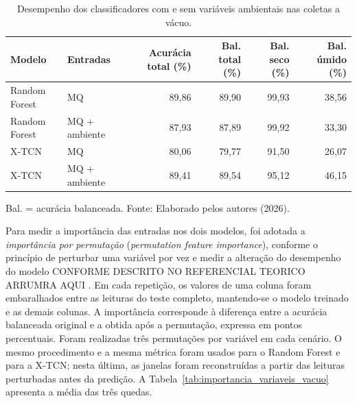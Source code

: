 \begin{table}[htbp]
    \centering
    \caption{Desempenho dos classificadores com e sem variáveis ambientais nas coletas a vácuo.}
    \label{tab:ablacao_ambiente_vacuo}
    \scriptsize
    \begin{tabular}{llrrrr}
        \hline
        \textbf{Modelo} & \textbf{Entradas} &
        \textbf{Acurácia total (\%)} &
        \textbf{Bal. total (\%)} &
        \textbf{Bal. seco (\%)} &
        \textbf{Bal. úmido (\%)} \\
        \hline
        Random Forest & MQ              & 89,86 & 89,90 & 99,93 & 38,56 \\
        Random Forest & MQ + ambiente   & 87,93 & 87,89 & 99,92 & 33,30 \\
        X-TCN         & MQ              & 80,06 & 79,77 & 91,50 & 26,07 \\
        X-TCN         & MQ + ambiente   & 89,41 & 89,54 & 95,12 & 46,15 \\
        \hline
    \end{tabular}

    \vspace{0.1cm}
    {\footnotesize Bal. = acurácia balanceada. Fonte: Elaborado pelos autores (2026).}
\end{table}

Para medir a importância das entradas nos dois modelos, foi adotada a
\emph{importância por permutação} (\emph{permutation feature importance}),
conforme o princípio de perturbar uma variável por vez e medir a alteração do
desempenho do modelo CONFORME DESCRITO NO REFERENCIAL TEORICO ARRUMRA AQUI \cite{fisher2019modelreliance}. Em cada repetição, os
valores de uma coluna foram embaralhados entre as leituras do teste completo,
mantendo-se o modelo treinado e as demais colunas. A importância corresponde à
diferença entre a acurácia balanceada original e a obtida após a permutação,
expressa em pontos percentuais. Foram realizadas três permutações por variável
em cada cenário. O mesmo procedimento e a mesma métrica foram usados para o
Random Forest e para a X-TCN; nesta última, as janelas foram reconstruídas a
partir das leituras perturbadas antes da predição. A
Tabela~\ref{tab:importancia_variaveis_vacuo} apresenta a média das três quedas.


